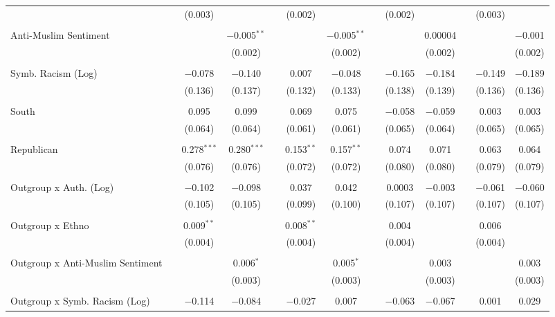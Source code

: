 \begin{table}[H]
{\begin{tabular}{@{\extracolsep{5pt}}lcccccccccccc}
  &  & (0.003) &  &  & (0.002) &  &  & (0.002) &  &  & (0.003) &  \\ 
  & & & & & & & & & & & & \\ 
 Anti-Muslim Sentiment &  &  & $-$0.005$^{**}$ &  &  & $-$0.005$^{**}$ &  &  & 0.00004 &  &  & $-$0.001 \\ 
  &  &  & (0.002) &  &  & (0.002) &  &  & (0.002) &  &  & (0.002) \\ 
  & & & & & & & & & & & & \\ 
 Symb. Racism (Log) &  & $-$0.078 & $-$0.140 &  & 0.007 & $-$0.048 &  & $-$0.165 & $-$0.184 &  & $-$0.149 & $-$0.189 \\ 
  &  & (0.136) & (0.137) &  & (0.132) & (0.133) &  & (0.138) & (0.139) &  & (0.136) & (0.136) \\ 
  & & & & & & & & & & & & \\ 
 South &  & 0.095 & 0.099 &  & 0.069 & 0.075 &  & $-$0.058 & $-$0.059 &  & 0.003 & 0.003 \\ 
  &  & (0.064) & (0.064) &  & (0.061) & (0.061) &  & (0.065) & (0.064) &  & (0.065) & (0.065) \\ 
  & & & & & & & & & & & & \\ 
 Republican &  & 0.278$^{***}$ & 0.280$^{***}$ &  & 0.153$^{**}$ & 0.157$^{**}$ &  & 0.074 & 0.071 &  & 0.063 & 0.064 \\ 
  &  & (0.076) & (0.076) &  & (0.072) & (0.072) &  & (0.080) & (0.080) &  & (0.079) & (0.079) \\ 
  & & & & & & & & & & & & \\ 
 Outgroup x Auth. (Log) &  & $-$0.102 & $-$0.098 &  & 0.037 & 0.042 &  & 0.0003 & $-$0.003 &  & $-$0.061 & $-$0.060 \\ 
  &  & (0.105) & (0.105) &  & (0.099) & (0.100) &  & (0.107) & (0.107) &  & (0.107) & (0.107) \\ 
  & & & & & & & & & & & & \\ 
 Outgroup x Ethno &  & 0.009$^{**}$ &  &  & 0.008$^{**}$ &  &  & 0.004 &  &  & 0.006 &  \\ 
  &  & (0.004) &  &  & (0.004) &  &  & (0.004) &  &  & (0.004) &  \\ 
  & & & & & & & & & & & & \\ 
 Outgroup x Anti-Muslim Sentiment &  &  & 0.006$^{*}$ &  &  & 0.005$^{*}$ &  &  & 0.003 &  &  & 0.003 \\ 
  &  &  & (0.003) &  &  & (0.003) &  &  & (0.003) &  &  & (0.003) \\ 
  & & & & & & & & & & & & \\ 
 Outgroup x Symb. Racism (Log) &  & $-$0.114 & $-$0.084 &  & $-$0.027 & 0.007 &  & $-$0.063 & $-$0.067 &  & 0.001 & 0.029 \\ 

\end{tabular}}
\end{table}
